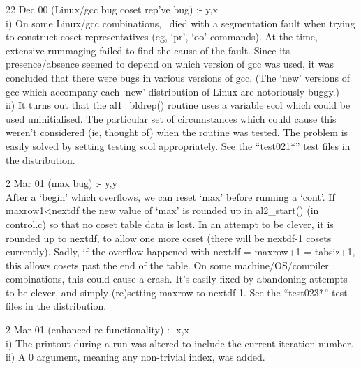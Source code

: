 22 Dec 00 (Linux/gcc bug \amp coset rep've bug) :- y,x \\
i) On some Linux/gcc combinations, \ace\ died with a segmentation fault
  when trying to construct coset representatives (eg, `pr', `oo' commands).
At the time, extensive rummaging failed to find the cause of the fault.
Since its presence/absence seemed to depend on which version of gcc was
  used, it was concluded that there were bugs in various versions of gcc.
(The `new' versions of gcc which accompany each `new' distribution of
  Linux are notoriously buggy.) \\
ii) It turns out that the al1\_bldrep() routine uses a variable scol which
  could be used uninitialised.
The particular set of circumstances which could cause this weren't
  considered (ie, thought of) when the routine was tested.
The problem is easily solved by setting \amp testing scol appropriately.
See the ``test021*'' test files in the distribution.
 
2 Mar 01 (max bug) :- y,y \\
After a `begin' which overflows, we can reset `max' before running a
  `cont'.
If maxrow1<nextdf the new value of `max' is rounded up in al2\_start() (in 
  control.c) so that no coset table data is lost.
In an attempt to be clever, it is rounded up to nextdf, to allow one more
  coset (there will be nextdf-1 cosets currently).
Sadly, if the overflow happened with nextdf = maxrow+1 = tabsiz+1, this
  allows cosets past the end of the table.
On some machine/OS/compiler combinations, this could cause a crash.
It's easily fixed by abandoning attempts to be clever, and simply
  (re)setting maxrow to nextdf-1.
See the ``test023*'' test files in the distribution.

2 Mar 01 (enhanced rc functionality) :- x,x \\
i) The printout during a run was altered to include the current iteration
  number. \\
ii) A 0 argument, meaning any non-trivial index, was added.

